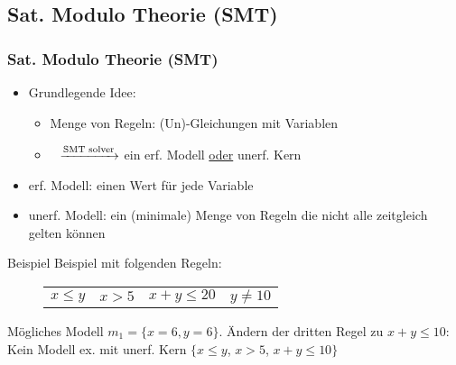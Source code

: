 \subsection{Sat. Modulo Theorie (SMT)}

\begin{frame}
	\frametitle{Sat. Modulo Theorie (SMT)}
	
	\begin{itemize}
		\item Grundlegende Idee: 
			\begin{itemize}
				\item[] Menge von Regeln: (Un)-Gleichungen mit Variablen
				\item[] \qquad$\>\>$ $\xrightarrow{\text{SMT solver}}$ ein erf. Modell \underline{oder} unerf. Kern
			\end{itemize}		
		\item \color{blue}erf. Modell\color{black}: einen Wert f\"ur jede Variable
		\item \color{blue}unerf. Modell\color{black}: ein (minimale) Menge von Regeln die nicht alle zeitgleich gelten k\"onnen
	\end{itemize}
	\begin{exampleblock}{Beispiel}
		Beispiel mit folgenden Regeln:
		\vspace*{-1em}
		\begin{figure}[H]
			\centering
			\begin{tabular}{cccc}
				$x \le y$ &	$x > 5 $ &	$ x+ y \le 20$ &$y \neq 10$ \\
			\end{tabular}
		\end{figure}
		\vspace*{-1em}
		 M\"ogliches Modell $m_1 = \{x=6, y=6\}$.\newline \newline
		 \"Andern der dritten Regel zu $x+y\le10$:\newline
		 Kein Modell ex. mit unerf. Kern $\{x \le y$, $x > 5$, $x+ y \le 10 \}$
	\end{exampleblock}
\end{frame}